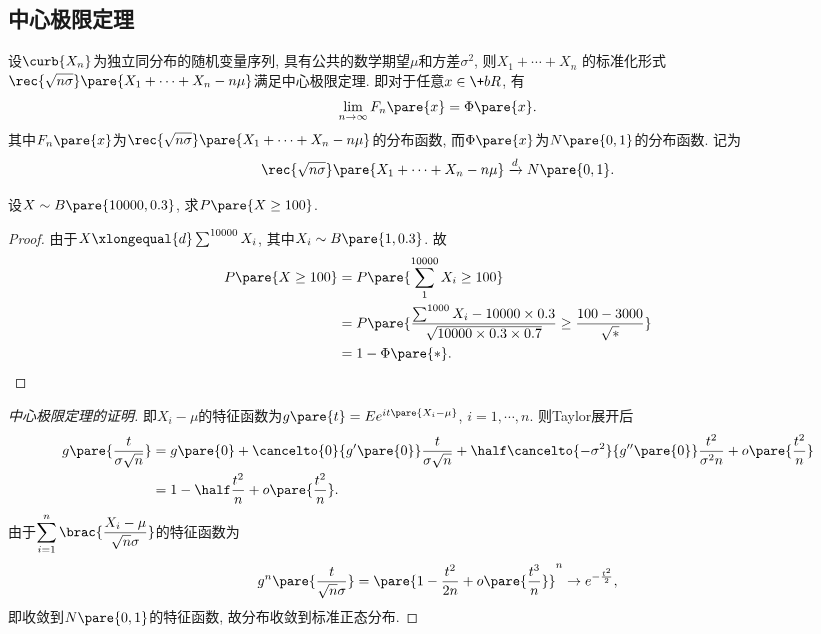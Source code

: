 \documentclass{ctexart}
\begin{document}

\subsection{中心极限定理} %
\label{sub:中心极限定理}

\begin{theorem}
    设$\curb{X_n}$为独立同分布的随机变量序列, 具有公共的数学期望$\mu$和方差$\sigma^2$, 则$X_1+\cdots+X_n$
    的标准化形式$\displaystyle \rec{\sqrt{n\sigma}}\pare{X_1 + \cdots + X_n - n\mu}$满足中心极限定理. 即对于任意$x\in \+bR$, 有
    \[ \lim_{n\rightarrow \infty} F_n\pare{x} = \Phi\pare{x}. \]
    其中$F_n\pare{x}$为$\displaystyle \rec{\sqrt{n\sigma}}\pare{X_1 + \cdots + X_n - n\mu}$的分布函数, 而$\Phi\pare{x}$为$N\pare{0,1}$的分布函数. 记为
    \[ \rec{\sqrt{n\sigma}}\pare{X_1 + \cdots + X_n - n\mu} \xrightarrow{d} N\pare{0,1}. \]
\end{theorem}
\begin{sample}
    \begin{ex}
        设$X\sim B\pare{10000, 0.3}$, 求$P\pare{X\ge 100}$.
    \end{ex}
    \begin{proof}
        由于$X \xlongequal{d} \sum^{10000}X_i$, 其中$X_i \sim B\pare{1,0.3}$. 故
        \begin{align*}
            P\pare{X\ge 100} &= P\pare{\sum_1^{10000}X_i \ge 100} \\
            &= P \pare{\frac{\sum^{1000}X_i - 10000\times 0.3}{\sqrt{10000\times 0.3 \times 0.7}} \ge \frac{100 - 3000}{\sqrt{*}}} \\
            &= 1 - \Phi\pare{*}. \qedhere
        \end{align*}
    \end{proof}
\end{sample}
\begin{proof}[中心极限定理的证明]
    即$X_i - \mu$的特征函数为$g\pare{t} = Ee^{it\pare{X_i - \mu}}$, $i=1,\cdots, n$. 则Taylor展开后
    \begin{align*}
        g\pare{\frac{t}{\sigma\sqrt{n}}} &= g\pare{0} + \cancelto{0}{g'\pare{0}} \frac{t}{\sigma\sqrt{n}} + \half  \cancelto{-\sigma^2}{g''\pare{0}} \frac{t^2}{\sigma^2 n} + o\pare{\frac{t^2}{n}} \\
        &= 1 - \half \frac{t^2}{n} + o\pare{\frac{t^2}{n}}.
    \end{align*}
    由于$\displaystyle \sum_{i=1}^n \brac{\frac{X_i - \mu}{\sqrt{n}\sigma}}$的特征函数为
    \[ g^n\pare{\frac{t}{\sqrt{n}\sigma}}  = \pare{1 - \frac{t^2}{2n} + o\pare{\frac{t^3}{n}}}^n \rightarrow e^{-\frac{t^2}{2}}, \]
    即收敛到$N\pare{0,1}$的特征函数, 故分布收敛到标准正态分布.
\end{proof}
\end{document}
